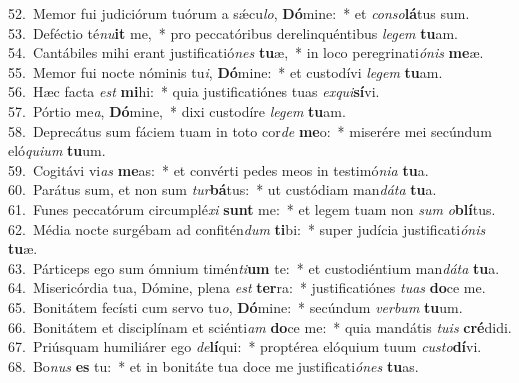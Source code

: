 {52.~}Memor fui judiciórum tuórum a sǽcu\textit{lo}, \textbf{Dó}mine:~* et \textit{con}\textit{so}\textbf{lá}tus sum.\\
{53.~}Deféctio té\textit{nu}\textbf{it} me,~* pro peccatóribus derelinquéntibus \textit{le}\textit{gem} \textbf{tu}am.\\
{54.~}Cantábiles mihi erant justificatió\textit{nes} \textbf{tu}æ,~* in loco peregrinati\textit{ó}\textit{nis} \textbf{me}æ.\\
{55.~}Memor fui nocte nóminis tu\textit{i}, \textbf{Dó}mine:~* et custodívi \textit{le}\textit{gem} \textbf{tu}am.\\
{56.~}Hæc facta \textit{est} \textbf{mi}hi:~* quia justificatiónes tuas \textit{ex}\textit{qui}\textbf{sí}vi.\\
{57.~}Pórtio me\textit{a}, \textbf{Dó}mine,~* dixi custodíre \textit{le}\textit{gem} \textbf{tu}am.\\
{58.~}Deprecátus sum fáciem tuam in toto cor\textit{de} \textbf{me}o:~* miserére mei secúndum eló\textit{qui}\textit{um} \textbf{tu}um.\\
{59.~}Cogitávi vi\textit{as} \textbf{me}as:~* et convérti pedes meos in testimó\textit{ni}\textit{a} \textbf{tu}a.\\
{60.~}Parátus sum, et non sum \textit{tur}\textbf{bá}tus:~* ut custódiam man\textit{dá}\textit{ta} \textbf{tu}a.\\
{61.~}Funes peccatórum circumplé\textit{xi} \textbf{sunt} me:~* et legem tuam non \textit{sum} \textit{o}\textbf{blí}tus.\\
{62.~}Média nocte surgébam ad confitén\textit{dum} \textbf{ti}bi:~* super judícia justificati\textit{ó}\textit{nis} \textbf{tu}æ.\\
{63.~}Párticeps ego sum ómnium timén\textit{ti}\textbf{um} te:~* et custodiéntium man\textit{dá}\textit{ta} \textbf{tu}a.\\
{64.~}Misericórdia tua, Dómine, plena \textit{est} \textbf{ter}ra:~* justificatiónes \textit{tu}\textit{as} \textbf{do}ce me.\\
{65.~}Bonitátem fecísti cum servo tu\textit{o}, \textbf{Dó}mine:~* secúndum \textit{ver}\textit{bum} \textbf{tu}um.\\
{66.~}Bonitátem et disciplínam et sciénti\textit{am} \textbf{do}ce me:~* quia mandátis \textit{tu}\textit{is} \textbf{cré}didi.\\
{67.~}Priúsquam humiliárer ego \textit{de}\textbf{lí}qui:~* proptérea elóquium tuum \textit{cu}\textit{sto}\textbf{dí}vi.\\
{68.~}Bo\textit{nus} \textbf{es} tu:~* et in bonitáte tua doce me justificati\textit{ó}\textit{nes} \textbf{tu}as.\\
